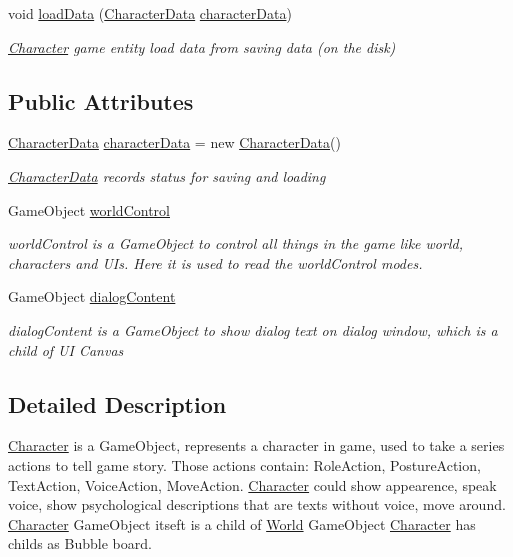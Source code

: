 \begin{DoxyCompactItemize}
void \hyperlink{class_character_a732de0e82f2e2f2edd9014f91e9df10b}{load\+Data} (\hyperlink{class_character_data}{Character\+Data} \hyperlink{class_character_af86674f9440ec86b61c057dbc1b8586e}{character\+Data})
\begin{DoxyCompactList}\small\item\em \hyperlink{class_character}{Character} game entity load data from saving data (on the disk) \end{DoxyCompactList}\end{DoxyCompactItemize}
\subsection*{Public Attributes}
\begin{DoxyCompactItemize}
\item 
\hyperlink{class_character_data}{Character\+Data} \hyperlink{class_character_af86674f9440ec86b61c057dbc1b8586e}{character\+Data} = new \hyperlink{class_character_data}{Character\+Data}()
\begin{DoxyCompactList}\small\item\em \hyperlink{class_character_data}{Character\+Data} records status for saving and loading \end{DoxyCompactList}\item 
Game\+Object \hyperlink{class_character_acb8eae0fe1b057a002e83b9fe6c5e02c}{world\+Control}
\begin{DoxyCompactList}\small\item\em world\+Control is a Game\+Object to control all things in the game like world, characters and U\+Is. Here it is used to read the world\+Control modes. \end{DoxyCompactList}\item 
Game\+Object \hyperlink{class_character_a9eb4f04ae4acf1fa7666b93d1f5c5da6}{dialog\+Content}
\begin{DoxyCompactList}\small\item\em dialog\+Content is a Game\+Object to show dialog text on dialog window, which is a child of UI Canvas \end{DoxyCompactList}\end{DoxyCompactItemize}


\subsection{Detailed Description}
\hyperlink{class_character}{Character} is a Game\+Object, represents a character in game, used to take a series actions to tell game story. Those actions contain\+: Role\+Action, Posture\+Action, Text\+Action, Voice\+Action, Move\+Action. \hyperlink{class_character}{Character} could show appearence, speak voice, show psychological descriptions that are texts without voice, move around. \hyperlink{class_character}{Character} Game\+Object itseft is a child of \hyperlink{class_world}{World} Game\+Object \hyperlink{class_character}{Character} has childs as Bubble board. 



